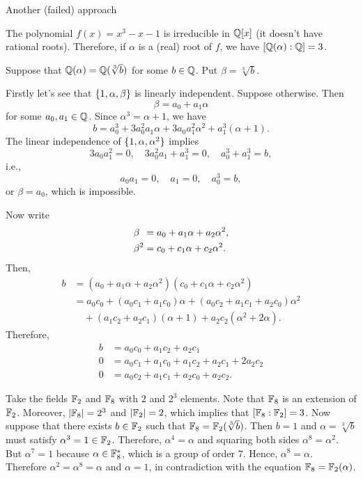 Another (failed) approach

\begin{solution}
    The polynomial $f(x)=x^3-x-1$ is irreducible in $\mathbb{Q}[x]$ (it doesn't have rational roots). Therefore, if $\alpha$ is a (real) root of $f$, we have $[\mathbb{Q}(\alpha):\mathbb{Q}]=3$.
    
    Suppose that $\mathbb{Q}(\alpha)=\mathbb{Q}(\sqrt[3]b)$ for some $b\in\mathbb{Q}$. Put $\beta=\sqrt[3]b$.
    
    Firstly let's see that $\{1,\alpha,\beta\}$ is linearly independent. Suppose otherwise. Then
    $$
        \beta = a_0 + a_1\alpha
    $$
    for some $a_0,a_1\in\mathbb{Q}$. Since $\alpha^3=\alpha+1$, we have
    $$
        b = a_0^3 + 3a_0^2a_1\alpha + 3a_0a_1^2\alpha^2+a_1^3(\alpha+1).
    $$
    The linear independence of $\{1,\alpha,\alpha^2\}$ implies
    $$
        3a_0a_1^2=0,\quad
        3a_0^2a_1+a_1^3=0,\quad
        a_0^3+a_1^3=b,
    $$
    i.e.,
    $$
        a_0a_1=0,\quad a_1=0,\quad a_0^3=b,
    $$
    or $\beta=a_0$, which is impossible.

    Now write
    \begin{align*}
        \beta\hphantom{{}^2} &= a_0 + a_1\alpha + a_2\alpha^2,\\
        \beta^2 &= c_0 + c_1\alpha + c_2\alpha^2.
    \end{align*}
    Then,
    \begin{align*}
        b
            &= (a_0 + a_1\alpha + a_2\alpha^2)
                (c_0 + c_1\alpha + c_2\alpha^2)\\
            &= a_0c_0 + (a_0c_1+a_1c_0)\alpha
                + (a_0c_2+a_1c_1+a_2c_0)\alpha^2\\
            &\quad+ (a_1c_2+a_2c_1)(\alpha+1)
                + a_2c_2(\alpha^2+2\alpha).
    \end{align*}
    Therefore,
    \begin{align*}
        b &= a_0c_0+a_1c_2+a_2c_1\\
        0 &= a_0c_1+a_1c_0+a_1c_2+a_2c_1+2a_2c_2\\
        0 &= a_0c_2+a_1c_1+a_2c_0 + a_2c_2.
    \end{align*}
\end{solution}
\fi

\begin{solution}
    Take the fields $\mathbb F_2$ and $\mathbb F_8$ with $2$ and $2^3$ elements. Note that $\mathbb F_8$ is an extension of $\mathbb F_2$. Moreover, $|\mathbb F_8|=2^3$ and $|\mathbb F_2|=2$, which implies that $[\mathbb F_8:\mathbb F_2]=3$. Now suppose that there exists $b\in\mathbb F_2$ such that $\mathbb F_8=\mathbb F_2(\sqrt[3]b)$. Then $b=1$ and $\alpha=\sqrt[3]b$ must satisfy $\alpha^3=1\in\mathbb F_2$. Therefore, $\alpha^4=\alpha$ and squaring both sides $\alpha^8=\alpha^2$. But $\alpha^7=1$ because $\alpha\in\mathbb F_8^*$, which is a group of order $7$. Hence, $\alpha^8=\alpha$. Therefore $\alpha^2=\alpha^8=\alpha$ and $\alpha=1$, in contradiction with the equation $\mathbb F_8=\mathbb F_2(\alpha)$.
    
\end{solution}

